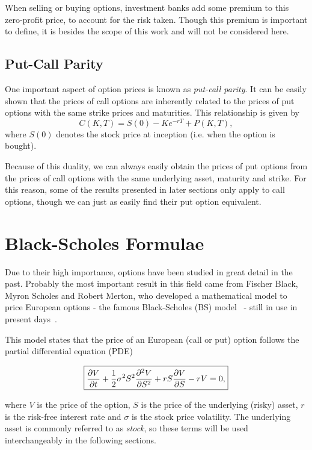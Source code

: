 When selling or buying options, investment banks add some premium to this zero-profit price, to account for the risk taken. Though this premium is important to define, it is besides the scope of this work and will not be considered here.

\subsection{Put-Call Parity}
One important aspect of option prices is known as \emph{put-call parity}. It can be easily shown that the prices of call options are inherently related to the prices of put options with the same strike prices and maturities. This relationship is given by
\begin{equation}
C(K,T)=S(0)-Ke^{-rT}+P(K,T),
\end{equation}
\noindent where $S(0)$ denotes the stock price at inception (i.e. when the option is bought).

Because of this duality, we can always easily obtain the prices of put options from the prices of call options with the same underlying asset, maturity and strike. For this reason, some of the results presented in later sections only apply to call options, though we can just as easily find their put option equivalent.
    
\section{Black-Scholes Formulae}
\label{section:Black-Scholes Formulae}
Due to their high importance, options have been studied in great detail in the past.
Probably the most important result in this field came from Fischer Black, Myron Scholes and Robert Merton, who developed a mathematical model to price European options - the famous Black-Scholes (BS) model~\citep{Scholes} - still in use in present days~\citep{Wilmott3}.

This model states that the price of an European (call or put) option follows the partial differential equation (PDE)

\begin{equation}\label{BS2}
\boxed{\pdv{V}{t}+\frac{1}{2}\sigma^2S^2\pdv{^2V}{S^2}+rS\pdv{V}{S}-rV=0,}
\end{equation}

\noindent where $V$ is the price of the option, $S$ is the price of the underlying (risky) asset, $r$ is the risk-free interest rate and $\sigma$ is the stock price volatility.
The underlying asset is commonly referred to as \emph{stock}, so these terms will be used interchangeably in the following sections.

